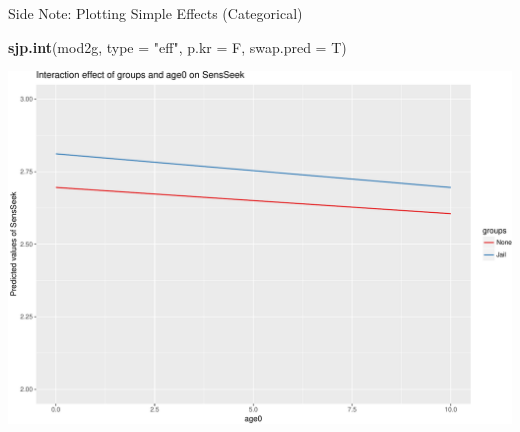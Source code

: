 \documentclass[ignorenonframetext,]{beamer}
\newenvironment{Shaded}{\begin{snugshade}}{\end{snugshade}}
\newcommand{\KeywordTok}[1]{\textcolor[rgb]{0.13,0.29,0.53}{\textbf{{#1}}}}
\newcommand{\DataTypeTok}[1]{\textcolor[rgb]{0.13,0.29,0.53}{{#1}}}
\newcommand{\StringTok}[1]{\textcolor[rgb]{0.31,0.60,0.02}{{#1}}}
\newcommand{\NormalTok}[1]{{#1}}
\begin{document}
\begin{frame}[fragile]{Side Note: Plotting Simple Effects (Categorical)}

\small

\begin{Shaded}
\begin{Highlighting}[]
\KeywordTok{sjp.int}\NormalTok{(mod2g, }\DataTypeTok{type =} \StringTok{"eff"}\NormalTok{, }\DataTypeTok{p.kr =} \NormalTok{F, }\DataTypeTok{swap.pred =} \NormalTok{T)}
\end{Highlighting}
\end{Shaded}

\includegraphics{Conditional_Models_files/figure-beamer/unnamed-chunk-27-1.pdf}

\end{frame}
\end{document}
